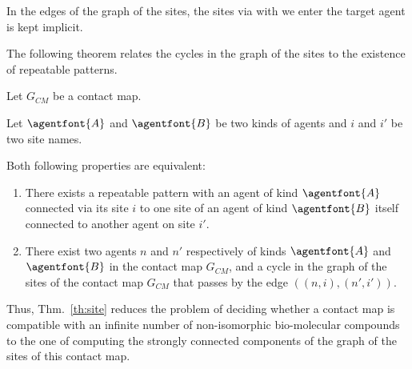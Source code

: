 \documentclass{entcs}
\newcommand{\graphsymb}{G}
\begin{document}
In the edges of the graph of the sites, the sites via with we enter the target agent is kept implicit.

The following theorem relates the cycles in the graph of the sites to the existence of repeatable patterns.

\begin{theorem}
  \label{th:site}
  Let $\graphsymb_{\textit{CM}}$ be a contact map.

Let $\agentfont{A}$ and $\agentfont{B}$ be two kinds of agents and
$i$ and $i'$ be two site names.

  Both following properties are equivalent:
  \begin{enumerate}
    \item There exists a repeatable pattern
    with an agent of kind $\agentfont{A}$ connected via its site $i$
    to one site of an agent of kind $\agentfont{B}$ itself connected to another agent on site $i'$.
\item There exist two agents $n$ and $n'$ respectively of kinds $\agentfont{A}$
and  $\agentfont{B}$ in the contact map $\graphsymb_{\textit{CM}}$, and a  cycle in the graph of the sites of the contact map    $\graphsymb_{\textit{CM}}$  that passes by the edge $((n,i),(n',i'))$.
  \end{enumerate}
\end{theorem}

Thus, Thm.~\ref{th:site} reduces the problem of deciding whether
a contact map is compatible with an infinite number of non-isomorphic bio-molecular compounds to the one of computing the strongly connected components of the graph of the sites of this contact map.
\end{document}
